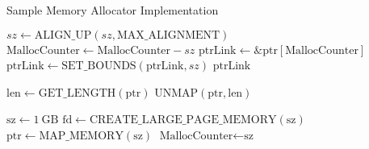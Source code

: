 \documentclass{article}
\begin{document}
\begin{algorithm}
\caption{Sample Memory Allocator Implementation}
\begin{algorithmic}[1]
    \State $sz \gets \text{ALIGN\_UP}(sz, \text{MAX\_ALIGNMENT})$ 
    \State $\text{MallocCounter} \gets \text{MallocCounter} - sz$ 
    \State $\text{ptrLink} \gets \&\text{ptr}[\text{MallocCounter}]$ 
    \State $\text{ptrLink} \gets \text{SET\_BOUNDS}(\text{ptrLink}, sz)$ 
    \State \Return $\text{ptrLink}$ 
\EndFunction
\end{algorithmic}
\end{algorithm}

\begin{algorithm}
\begin{algorithmic}[1]
    \State $\text{len} \gets \text{GET\_LENGTH}(\text{ptr})$ 
    \State $\text{UNMAP}(\text{ptr}, \text{len})$ 
\EndFunction
\end{algorithmic}
\end{algorithm}

\begin{algorithm}
\begin{algorithmic}[1]
    \State $\text{sz} \gets 1\ \text{GB}$ 
    \State $\text{fd} \gets \text{CREATE\_LARGE\_PAGE\_MEMORY}(\text{sz})$ 
    \State $\text{ptr} \gets \text{MAP\_MEMORY}(\text{sz})$ 
    \State $\text{MallocCounter} \gets \text{sz}$ 
\EndFunction
\end{algorithmic}
\end{algorithm}
\end{document}
